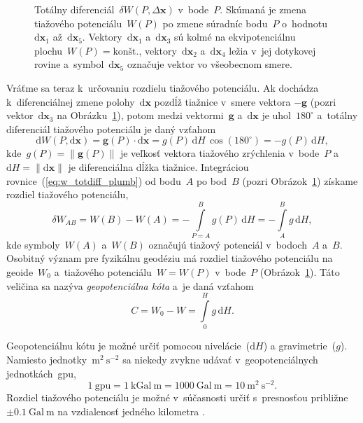 \documentclass[a4paper, 12pt]{book}
\newcommand{\diff}{\mathrm d}
\let\vec\mathbf
\begin{document}
\begin{figure}
\centering

\caption{Totálny diferenciál~$\delta W(P, \Delta \vec x)$ v~bode~$P$.  Skúmaná 
je zmena tiažového potenciálu~$W(P)$ po zmene súradníc bodu~$P$ o~hodnotu 
$\diff \vec x_1$ až~$\diff \vec x_5$.  Vektory~$\diff \vec x_1$ a~$\diff \vec 
x_3$ sú kolmé na ekvipotenciálnu plochu~$W(P) = \textrm{kon\v{s}t.}$, 
vektory~$\diff \vec x_2$ a~$\diff \vec x_4$ ležia v~jej dotykovej rovine 
a~symbol~$\diff \vec x_5$ označuje vektor vo všeobecnom smere.}
\label{fig:total_differential}
\end{figure}

Vráťme sa teraz k~určovaniu rozdielu tiažového potenciálu.  Ak dochádza 
k~diferenciálnej zmene polohy~$\diff \vec x$ pozdĺž tiažnice v~smere vektora 
$-\vec g$ (pozri vektor~$\diff \vec x_3$ na 
Obrázku~\ref{fig:total_differential}), potom medzi vektormi~$\vec g$ a~$\diff 
\vec x$ je uhol~$180^{\circ}$ a~totálny diferenciál tiažového potenciálu je 
daný vzťahom
%
\begin{equation}
\label{eq:w_totdiff_plumb}
\diff W(P, \diff \vec x) = \vec g(P) \cdot \diff \vec x = g(P) \, \diff H \, 
\cos(180^{\circ}) = -g(P) \, \diff H{,}
\end{equation}
%
kde~$g(P) = \| \vec g(P) \|$ je veľkosť vektora tiažového zrýchlenia v~bode~$P$ 
a~$\diff H = \| \diff \vec x \|$ je diferenciálna dĺžka tiažnice.  Integráciou 
rovnice~(\ref{eq:w_totdiff_plumb}) od bodu~$A$ po bod~$B$ (pozri 
Obrázok~\ref{fig:total_differential}) získame rozdiel tiažového potenciálu,
%
\begin{equation}
\label{eq:w_ab}
\delta W_{AB} = W(B) - W(A) = -\int\limits_{P = A}^{B} g(P) \, \diff 
H = -\int\limits_{A}^{B} g \, \diff H{,}
\end{equation}
%
kde symboly~$W(A)$ a~$W(B)$ označujú tiažový potenciál v~bodoch~$A$ a~$B$.  
Osobitný význam pre fyzikálnu geodéziu má rozdiel tiažového potenciálu na 
geoide~$W_0$ a~tiažového potenciálu~$W = W(P)$ v~bode~$P$ 
(Obrázok~\ref{fig:total_differential}).  Táto veličina sa nazýva 
\emph{geopotenciálna kóta} a~je daná vzťahom
%
\begin{equation}
\label{eq:geopotential_number}
C = W_0 - W = \int\limits_0^H g \, \diff H{.}
\end{equation}

Geopotenciálnu kótu je možné určiť pomocou nivelácie~($\diff H$) 
a gravimetrie~($g$).  Namiesto jednotky~$\mathrm{m}^2\ \mathrm{s}^{-2}$ sa 
niekedy zvykne udávať v~geopotenciálnych jednotkách~gpu,
%
\begin{equation}
\label{eq:gpu_unit}
1\ \mathrm{gpu} = 1\ \mathrm{kGal} \ \mathrm{m} = 1000\ \mathrm{Gal}\ 
\mathrm{m} = 10\ \mathrm{m}^2 \ \mathrm{s}^{-2}{.}
\end{equation}
%
Rozdiel tiažového potenciálu je možné v~súčasnosti určiť s~presnosťou približne 
$\pm 0.1\ \mathrm{Gal} \ \mathrm{m}$ na vzdialenosť jedného kilometra 
\parencite{MoritzPhysicalGeodesy}.
\end{document}
